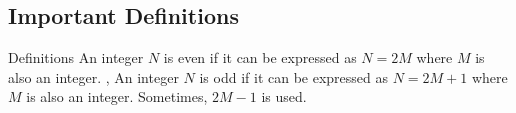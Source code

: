 \subsection{Important Definitions}
\begin{namedframe}{Definitions}
	An integer $N$ is even if it can be expressed as $N=2M$ where $M$ is also an integer.
	\sep
	An integer $N$ is odd if it can be expressed as $N=2M+1$ where $M$ is also an integer.
	\pause
	Sometimes, $2M-1$ is used.
\end{namedframe}